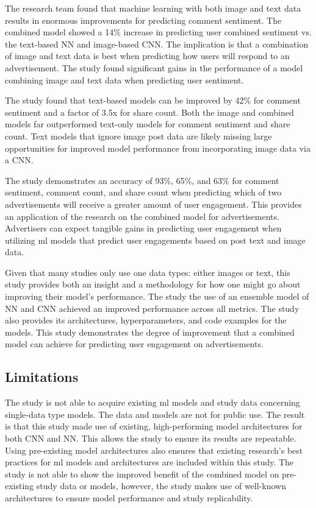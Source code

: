 \documentclass[mksc,blindrev]{informs3} %
\begin{document}
The research team found that machine learning with both image and text data results in enormous improvements for predicting comment sentiment. The combined model showed a 14\% increase in predicting user combined sentiment vs. the text-based NN and image-based CNN. The implication is that a combination of image and text data is best when predicting how users will respond to an advertisement. The study found significant gains in the performance of a model combining image and text data when predicting user sentiment.

The study found that text-based models can be improved by 42\% for comment sentiment and a factor of 3.5x for share count. Both the image and combined models far outperformed text-only models for comment sentiment and share count. Text models that ignore image post data are likely missing large opportunities for improved model performance from incorporating image data via a CNN. 

The study demonstrates an accuracy of 93\%, 65\%, and 63\% for comment sentiment, comment count, and share count when predicting which of two advertisements will receive a greater amount of user engagement. This provides an application of the research on the combined model for advertisements. Advertisers can expect tangible gains in predicting user engagement when utilizing ml models that predict user engagements based on post text and image data. 

Given that many studies only use one data types: either images or text, this study provides both an insight and a methodology for how one might go about improving their model's performance. The study the use of an ensemble model of NN and CNN achieved an improved performance across all metrics. The study also provides its architectures, hyperparameters, and code examples for the models. This study demonstrates the degree of improvement that a combined model can achieve for predicting user engagement on advertisements.

\subsection{Limitations}

The study is not able to acquire existing ml models and study data concerning single-data type models. The data and models are not for public use. The result is that this study made use of existing, high-performing model architectures for both CNN and NN. This allows the study to ensure its results are repeatable. Using pre-existing model architectures also ensures that existing research's best practices for ml models and architectures are included within this study. The study is not able to show the improved benefit of the combined model on pre-existing study data or models, however, the study makes use of well-known architectures to ensure model performance and study replicability. 
\end{document}
